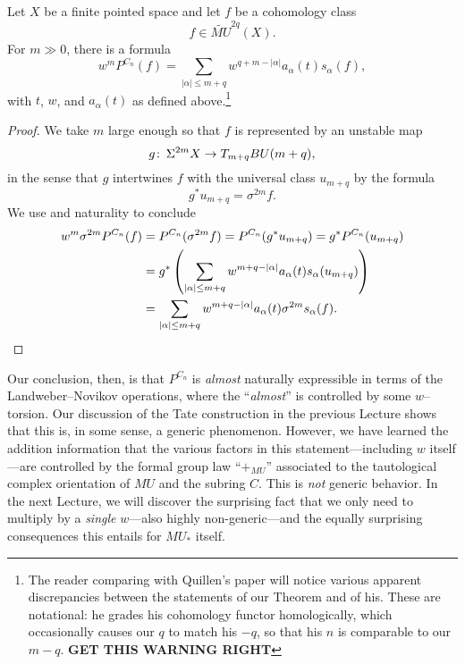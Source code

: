 \begin{theorem}\label{QuillensKeyRelation}
Let $X$ be a finite pointed space and let $f$ be a cohomology class \[f \in \widetilde{MU}^{2q}(X).\]  For $m \gg 0$, there is a formula \[w^m P^{C_n}(f) = \sum_{|\alpha| \le m+q} w^{q+m - |\alpha|} a_\alpha(t) s_\alpha(f),\] with $t$, $w$, and $a_\alpha(t)$ as defined above.\footnote{The reader comparing with Quillen's paper will notice various apparent discrepancies between the statements of our Theorem and of his.  These are notational: he grades his cohomology functor homologically, which occasionally causes our $q$ to match his $-q$, so that his $n$ is comparable to our $m-q$.  \textbf{GET THIS WARNING RIGHT}}
\end{theorem}
\begin{proof}
We take $m$ large enough so that $f$ is represented by an unstable map \[g\colon\thinspace \Sigma^{2m} X \to T_{m+q} BU(m+q),\] in the sense that $g$ intertwines $f$ with the universal class $u_{m+q}$ by the formula \[g^* u_{m+q} = \sigma^{2m} f.\]  We use  and naturality to conclude
\begin{align*}
w^m \sigma^{2m} P^{C_n}(f) & = P^{C_n}(\sigma^{2m} f) = P^{C_n}(g^* u_{m+q}) = g^* P^{C_n}(u_{m+q}) \\
& = g^* \left(\sum_{|\alpha| \le m+q} w^{m+q - |\alpha|} a_\alpha(t) s_\alpha(u_{m+q}) \right) \\
& = \sum_{|\alpha| \le m+q} w^{m+q - |\alpha|} a_\alpha(t) \sigma^{2m} s_\alpha(f). \qedhere
\end{align*}
\end{proof}

Our conclusion, then, is that $P^{C_n}$ is \emph{almost} naturally expressible in terms of the Landweber--Novikov operations, where the ``\emph{almost}'' is controlled by some $w$--torsion.  Our discussion of the Tate construction in the previous Lecture shows that this is, in some sense, a generic phenomenon.  However, we have learned the addition information that the various factors in this statement---including $w$ itself---are controlled by the formal group law ``$+_{MU}$'' associated to the tautological complex orientation of $MU$ and the subring $C$.  This is \emph{not} generic behavior.  In the next Lecture, we will discover the surprising fact that we only need to multiply by a \emph{single} $w$---also highly non-generic---and the equally surprising consequences this entails for $MU_*$ itself.











